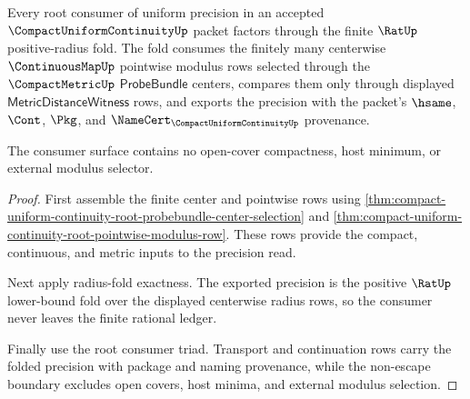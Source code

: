 \begin{theorem}
\label{thm:compact-uniform-continuity-root-rational-fold-consumer}
Every root consumer of uniform precision in an accepted $\CompactUniformContinuityUp$ packet factors through the finite $\RatUp$ positive-radius fold. The fold consumes the finitely many centerwise $\ContinuousMapUp$ pointwise modulus rows selected through the $\CompactMetricUp$ $\mathsf{ProbeBundle}$ centers, compares them only through displayed $\mathsf{MetricDistanceWitness}$ rows, and exports the precision with the packet's $\hsame$, $\Cont$, $\Pkg$, and $\NameCert_{\CompactUniformContinuityUp}$ provenance.

The consumer surface contains no open-cover compactness, host minimum, or external modulus selector.
\end{theorem}
\begin{proof}
First assemble the finite center and pointwise rows using \autoref{thm:compact-uniform-continuity-root-probebundle-center-selection} and \autoref{thm:compact-uniform-continuity-root-pointwise-modulus-row}. These rows provide the compact, continuous, and metric inputs to the precision read.

Next apply radius-fold exactness. The exported precision is the positive $\RatUp$ lower-bound fold over the displayed centerwise radius rows, so the consumer never leaves the finite rational ledger.

Finally use the root consumer triad. Transport and continuation rows carry the folded precision with package and naming provenance, while the non-escape boundary excludes open covers, host minima, and external modulus selection.
\end{proof}

